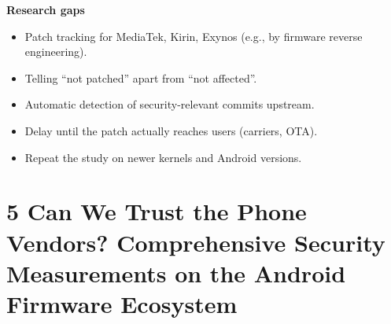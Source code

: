 \documentclass[11pt,a4paper]{article}
\begin{document}
\begin{enumerate}
    \vspace{4pt}
    \textbf{Research gaps}
    \begin{itemize}
        \item Patch tracking for MediaTek, Kirin, Exynos (e.g., by firmware reverse engineering).
        \item Telling ``not patched'' apart from ``not affected''.
        \item Automatic detection of security-relevant commits upstream.
        \item Delay until the patch actually reaches users (carriers, OTA).
        \item Repeat the study on newer kernels and Android versions.
    \end{itemize}

\end{enumerate}

\newpage

\section{5 Can We Trust the Phone Vendors? Comprehensive Security Measurements on the Android Firmware Ecosystem}
\end{document}
